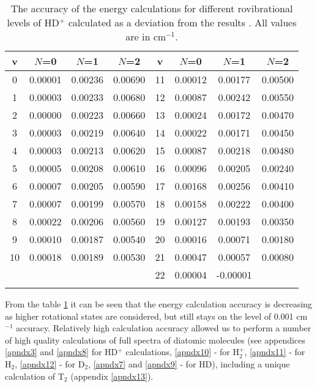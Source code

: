 \begin{table}[t]
\caption[The accuracy of the energy 
calculations for different
rovibrational levels of HD$^+$]{The accuracy of the energy 
calculations for different
rovibrational levels of HD$^+$
calculated as a deviation from the results \cite{Karr}. 
All values are in cm$^{-1}$.}
\centering
\def\arraystretch{1.}
\setlength{\tabcolsep}{.75em}
\begin{tabular}{c c c c | c c c c}
\hline \hline
v & $N$=0 & $N$=1 & $N$=2 & v & $N$=0 & $N$=1 & $N$=2  \\
\hline
0	&	0.00001	&	0.00236	&	0.00690	& 11	&	0.00012	&	0.00177	&	0.00500	\\
1	&	0.00003	&	0.00233	&	0.00680	& 12	&	0.00087	&	0.00242	&	0.00550	\\
2	&	0.00000	&	0.00223	&	0.00660	& 13	&	0.00024	&	0.00172	&	0.00470	\\
3	&	0.00003	&	0.00219	&	0.00640	& 14	&	0.00022	&	0.00171	&	0.00450	\\
4	&	0.00003	&	0.00213	&	0.00620	& 15	&	0.00087	&	0.00218	&	0.00480	\\
5	&	0.00005	&	0.00208	&	0.00610	& 16	&	0.00096	&	0.00205	&	0.00240	\\
6	&	0.00007	&	0.00205	&	0.00590	& 17	&	0.00168	&	0.00256	&	0.00410	\\
7	&	0.00007	&	0.00199	&	0.00570	& 18	&	0.00158	&	0.00222	&	0.00400	\\
8	&	0.00022	&	0.00206	&	0.00560	& 19	&	0.00127	&	0.00193	&	0.00350	\\
9	&	0.00010	&	0.00187	&	0.00540	& 20	&	0.00016	&	0.00071	&	0.00180	\\
10	&	0.00018	&	0.00189	&	0.00530	& 21	&	0.00047	&	0.00057	&	0.00080	\\
    &            &           &           & 22	&	0.00004	&	-0.00001	&	     \\
\hline
\label{table_energy}
\end{tabular}
\end{table}

From the table \ref{table_energy} it can be seen that the energy calculation
accuracy is decreasing as higher rotational states are considered, but still
stays on the level of 0.001 cm$^{-1}$ accuracy.
Relatively high calculation accuracy allowed us to perform a number
of high quality calculations of full spectra of diatomic molecules
(see appendices \ref{apndx3} and \ref{apndx8} for HD$^+$ calculations, 
\ref{apndx10} - for H$_2^+$, \ref{apndx11} - for H$_2$, \ref{apndx12} - 
for D$_2$, \ref{apndx7} and \ref{apndx9} - for HD), including 
a unique calculation of T$_2$ (appendix \ref{apndx13}). 

